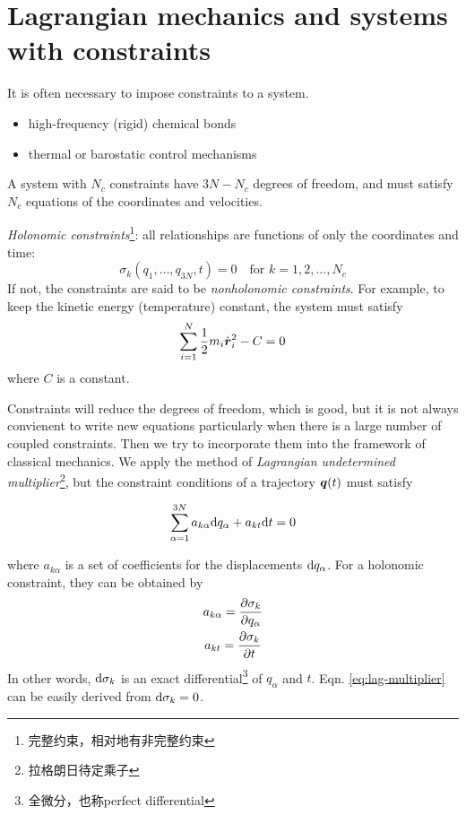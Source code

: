 \section{Lagrangian mechanics and systems with constraints}
It is often necessary to impose constraints to a system.

\example \begin{itemize}
	\item high-frequency (rigid) chemical bonds
	\item thermal or barostatic control mechanisms
\end{itemize}

A system with $N_c$ constraints have $3N-N_c$ degrees of freedom, and must satisfy $N_c$ equations of the coordinates and velocities.

\textit{Holonomic constraints}\footnote{完整约束，相对地有非完整约束}: all relationships are functions of only the coordinates and time:
\begin{equation}
	\sigma_k(q_1,\dots,q_{3N},t)=0\quad \text{for } k=1,2,\dots,N_c
\end{equation}
If not, the constraints are said to be \textit{nonholonomic constraints}. 
For example, to keep the kinetic energy (temperature) constant, the system must satisfy
\begin{equation}
	\sum_{i=1}^N\dfrac{1}{2} m_i\dot{\boldsymbol{r}}_i^2-C=0 \label{eq:kinetic-constrain}
\end{equation}
where $C$ is a constant.

Constraints will reduce the degrees of freedom, which is good, but it is not always convienent to write new equations particularly when there is a large number of coupled constraints. 
Then we try to incorporate them into the framework of classical mechanics.
We apply the method of \textit{Lagrangian undetermined multiplier}\footnote{拉格朗日待定乘子}, but the constraint conditions of a trajectory $\boldsymbol{q}(t)$ must satisfy
\begin{tcolorbox}
	\begin{equation}
		\sum_{\alpha=1}^{3N} a_{k\alpha}\mathrm{d} q_\alpha+a_{kt}\mathrm{d} t=0 \label{eq:lag-multiplier}
	\end{equation}
\end{tcolorbox}
where $a_{k\alpha}$ is a set of coefficients for the displacements $\mathrm{d} q_\alpha$. For a holonomic constraint, they can be obtained by
\begin{gather}
	a_{k\alpha}=\dfrac{\partial \sigma_k}{\partial q_\alpha}\\
	a_{kt}=\dfrac{\partial \sigma_k}{\partial t}
\end{gather}
In other words, $\mathrm{d}\sigma_k$ is an exact differential\footnote{全微分，也称perfect differential} of $q_\alpha$ and $t$. Eqn. \ref{eq:lag-multiplier} can be easily derived from $\mathrm{d}\sigma_k=0$.

